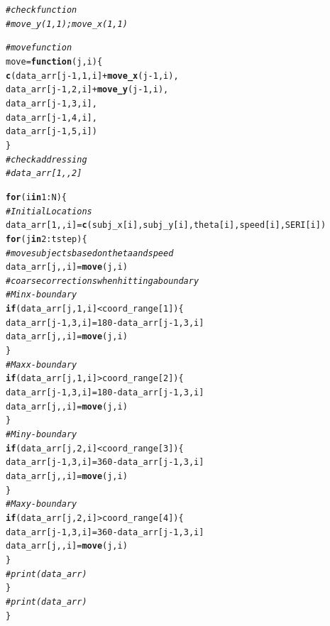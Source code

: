 \documentclass{article}\usepackage[]{graphicx}\usepackage[]{color}
\makeatletter
\newcommand{\hlnum}[1]{\textcolor[rgb]{0.686,0.059,0.569}{#1}}%
\newcommand{\hlcom}[1]{\textcolor[rgb]{0.678,0.584,0.686}{\textit{#1}}}%
\newcommand{\hlopt}[1]{\textcolor[rgb]{0,0,0}{#1}}%
\newcommand{\hlstd}[1]{\textcolor[rgb]{0.345,0.345,0.345}{#1}}%
\newcommand{\hlkwa}[1]{\textcolor[rgb]{0.161,0.373,0.58}{\textbf{#1}}}%
\newcommand{\hlkwb}[1]{\textcolor[rgb]{0.69,0.353,0.396}{#1}}%
\newcommand{\hlkwc}[1]{\textcolor[rgb]{0.333,0.667,0.333}{#1}}%
\newcommand{\hlkwd}[1]{\textcolor[rgb]{0.737,0.353,0.396}{\textbf{#1}}}%
\newenvironment{kframe}{%
 \def\at@end@of@kframe{}%
 \ifinner\ifhmode%
  \def\at@end@of@kframe{\end{minipage}}%
  \begin{minipage}{\columnwidth}%
 \fi\fi%
 \def\FrameCommand##1{\hskip\@totalleftmargin \hskip-\fboxsep
 \colorbox{shadecolor}{##1}\hskip-\fboxsep
     \hskip-\linewidth \hskip-\@totalleftmargin \hskip\columnwidth}%
 \MakeFramed {\advance\hsize-\width
   \@totalleftmargin\z@ \linewidth\hsize
   \@setminipage}}%
 {\par\unskip\endMakeFramed%
 \at@end@of@kframe}
\newenvironment{knitrout}{}{} %
\makeatother
\begin{document}
\begin{knitrout}
\begin{kframe}
\begin{alltt}
\hlcom{# check function }
\hlcom{# move_y(1, 1); move_x(1,1)}

\hlcom{# move function}
\hlstd{move} \hlkwb{=} \hlkwa{function}\hlstd{(}\hlkwc{j}\hlstd{,} \hlkwc{i}\hlstd{)\{}
  \hlkwd{c}\hlstd{(data_arr[j}\hlopt{-}\hlnum{1}\hlstd{,} \hlnum{1}\hlstd{, i]}\hlopt{+} \hlkwd{move_x}\hlstd{(j}\hlopt{-}\hlnum{1}\hlstd{,i),}
    \hlstd{data_arr[j}\hlopt{-}\hlnum{1}\hlstd{,} \hlnum{2}\hlstd{, i]}\hlopt{+} \hlkwd{move_y}\hlstd{(j}\hlopt{-}\hlnum{1}\hlstd{,i),}
    \hlstd{data_arr[j}\hlopt{-}\hlnum{1}\hlstd{,} \hlnum{3}\hlstd{, i],}
    \hlstd{data_arr[j}\hlopt{-}\hlnum{1}\hlstd{,} \hlnum{4}\hlstd{, i],}
    \hlstd{data_arr[j}\hlopt{-}\hlnum{1}\hlstd{,} \hlnum{5}\hlstd{, i])}
\hlstd{\}}
\hlcom{# check addressing}
\hlcom{# data_arr[1,, 2]}

\hlkwa{for}\hlstd{(i} \hlkwa{in} \hlnum{1}\hlopt{:}\hlstd{N)\{}
  \hlcom{# Initial Locations}
  \hlstd{data_arr[}\hlnum{1}\hlstd{,,i]} \hlkwb{=} \hlkwd{c}\hlstd{(subj_x[i], subj_y[i], theta[i], speed[i], SERI[i])}
  \hlkwa{for}\hlstd{(j} \hlkwa{in} \hlnum{2}\hlopt{:}\hlstd{tstep)\{}
    \hlcom{# move subjects based on theta and speed}
    \hlstd{data_arr[j,,i]} \hlkwb{=} \hlkwd{move}\hlstd{(j, i)}
    \hlcom{# coarse corrections when hitting a boundary}
    \hlcom{# Min x-boundary}
    \hlkwa{if}\hlstd{(data_arr[j,}\hlnum{1}\hlstd{,i]} \hlopt{<} \hlstd{coord_range[}\hlnum{1}\hlstd{])\{}
      \hlstd{data_arr[j}\hlopt{-}\hlnum{1}\hlstd{,}\hlnum{3}\hlstd{,i]}\hlkwb{=}\hlnum{180}\hlopt{-}\hlstd{data_arr[j}\hlopt{-}\hlnum{1}\hlstd{,}\hlnum{3}\hlstd{,i]}
      \hlstd{data_arr[j,,i]} \hlkwb{=} \hlkwd{move}\hlstd{(j,i)}
    \hlstd{\}}
    \hlcom{#Max x-boundary}
    \hlkwa{if}\hlstd{(data_arr[j,}\hlnum{1}\hlstd{,i]} \hlopt{>} \hlstd{coord_range[}\hlnum{2}\hlstd{])\{}
      \hlstd{data_arr[j}\hlopt{-}\hlnum{1}\hlstd{,}\hlnum{3}\hlstd{,i]}\hlkwb{=}\hlnum{180}\hlopt{-}\hlstd{data_arr[j}\hlopt{-}\hlnum{1}\hlstd{,}\hlnum{3}\hlstd{,i]}
      \hlstd{data_arr[j,,i]} \hlkwb{=} \hlkwd{move}\hlstd{(j,i)}
    \hlstd{\}}
    \hlcom{#Min y-boundary}
    \hlkwa{if}\hlstd{(data_arr[j,}\hlnum{2}\hlstd{,i]} \hlopt{<} \hlstd{coord_range[}\hlnum{3}\hlstd{])\{}
      \hlstd{data_arr[j}\hlopt{-}\hlnum{1}\hlstd{,}\hlnum{3}\hlstd{,i]}\hlkwb{=}\hlnum{360}\hlopt{-}\hlstd{data_arr[j}\hlopt{-}\hlnum{1}\hlstd{,}\hlnum{3}\hlstd{,i]}
      \hlstd{data_arr[j,,i]} \hlkwb{=} \hlkwd{move}\hlstd{(j,i)}
    \hlstd{\}}
    \hlcom{#Max y-boundary}
    \hlkwa{if}\hlstd{(data_arr[j,}\hlnum{2}\hlstd{,i]} \hlopt{>} \hlstd{coord_range[}\hlnum{4}\hlstd{])\{}
      \hlstd{data_arr[j}\hlopt{-}\hlnum{1}\hlstd{,}\hlnum{3}\hlstd{,i]}\hlkwb{=}\hlnum{360}\hlopt{-}\hlstd{data_arr[j}\hlopt{-}\hlnum{1}\hlstd{,}\hlnum{3}\hlstd{,i]}
      \hlstd{data_arr[j,,i]} \hlkwb{=} \hlkwd{move}\hlstd{(j,i)}
    \hlstd{\}}
   \hlcom{# print(data_arr)}
  \hlstd{\}}
  \hlcom{#print(data_arr)}
\hlstd{\}}
\end{alltt}
\end{kframe}
\end{knitrout}
\end{document}

